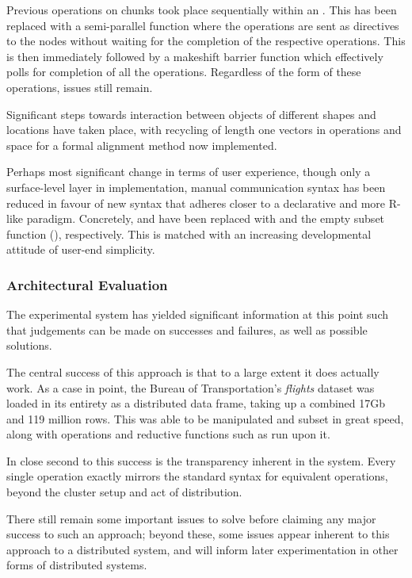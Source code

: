 Previous operations on chunks took place sequentially within an .
This has been replaced with a semi-parallel function where the operations are sent as directives to the nodes without waiting for the completion of the respective operations.
This is then immediately followed by a makeshift barrier function which effectively polls for completion of all the operations.
Regardless of the form of these operations, issues still remain.

Significant steps towards interaction between objects of different shapes and locations have taken place, with recycling of length one vectors in operations and space for a formal alignment method now implemented.

Perhaps most significant change in terms of user experience, though only a surface-level layer in implementation, manual communication syntax has been reduced in favour of new syntax that adheres closer to a declarative and more R-like paradigm.
Concretely,  and  have been replaced with  and the empty subset function (), respectively.
This is matched with an increasing developmental attitude of user-end simplicity.

\subsubsection{Architectural Evaluation}\label{sec:eval}

The experimental system has yielded significant information at this point such that judgements can be made on successes and failures, as well as possible solutions.

The central success of this approach is that to a large extent it does actually work.
As a case in point, the Bureau of Transportation's \emph{flights} \cite{bot2009flights} dataset was loaded in its entirety as a distributed data frame, taking up a combined 17Gb and 119 million rows.
This was able to be manipulated and subset in great speed, along with operations and reductive functions such as  run upon it.

In close second to this success is the transparency inherent in the system.
Every single operation exactly mirrors the standard \R{} syntax for equivalent operations, beyond the cluster setup and act of distribution.

There still remain some important issues to solve before claiming any major success to such an approach; beyond these, some issues appear inherent to this approach to a distributed system, and will inform later experimentation in other forms of distributed systems.

